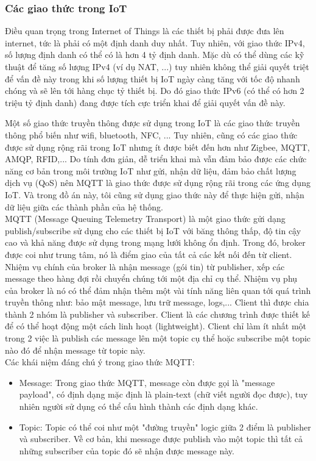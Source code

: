 \subsubsection{Các giao thức trong IoT}
Điều quan trọng trong Internet of Things là các thiết bị phải được đưa lên internet, tức là phải có một định danh duy nhất. Tuy nhiên, với giao thức IPv4, số lượng định danh có thể có là hơn 4 tỷ định danh. Mặc dù có thể dùng các kỹ thuật để tăng số lượng IPv4 (ví dụ NAT, ...) tuy nhiên không thể giải quyết triệt để vấn đề này trong khi số lượng thiết bị IoT ngày càng tăng với tốc độ nhanh chóng và sẽ lên tới hàng chục tỷ thiết bị. Do đó giao thức IPv6 (có thể có hơn 2 triệu tỷ định danh) đang được tích cực triển khai để giải quyết vấn đề này. 

Một số giao thức truyền thông được sử dụng trong IoT là các giao thức truyền thông phổ biến như wifi, bluetooth, NFC, ... Tuy nhiên, cũng có các giao thức được sử dụng rộng rãi trong IoT nhưng ít được biết đến hơn như Zigbee, MQTT, AMQP, RFID,... Do tính đơn giản, dễ triển khai mà vẫn đảm bảo được các chức năng cơ bản trong môi trường IoT như gửi, nhận dữ liệu, đảm bảo chất lượng dịch vụ (QoS) nên MQTT là giao thức được sử dụng rộng rãi trong các ứng dụng IoT. Và trong đồ án này, tôi cũng sử dụng giao thức này để thực hiện gửi, nhận dữ liệu giữa các thành phần của hệ thống.\\ 
MQTT (Message Queuing Telemetry Transport) là một giao thức gửi dạng publish/subscribe sử dụng cho các thiết bị IoT với băng thông thấp, độ tin cậy cao và khả năng được sử dụng trong mạng lưới không ổn định. Trong đó, broker được coi như trung tâm, nó là điểm giao của tất cả các kết nối đến từ client. Nhiệm vụ chính của broker là nhận message (gói tin) từ publisher, xếp các message theo hàng đợi rồi chuyển chúng tới một địa chỉ cụ thể. Nhiệm vụ phụ của broker là nó có thể đảm nhận thêm một vài tính năng liên quan tới quá trình truyền thông như: bảo mật message, lưu trữ message, logs,... Client thì được chia thành 2 nhóm là publisher và subscriber. Client là các chương trình được thiết kế để có thể hoạt động một cách linh hoạt (lightweight). Client chỉ làm ít nhất một trong 2 việc là publish các message lên một topic cụ thể hoặc subscribe một topic nào đó để nhận message từ topic này. \\
Các khái niệm đáng chú ý trong giao thức MQTT:
\begin{itemize}
	\item Message: Trong giao thức MQTT, message còn được gọi là "message payload", có định dạng mặc định là plain-text (chữ viết người đọc được), tuy nhiên người sử dụng có thể cấu hình thành các định dạng khác.
	\item Topic: Topic có thể coi như một "đường truyền" logic giữa 2 điểm là publisher và subscriber. Về cơ bản, khi message được publish vào một topic thì tất cả những subscriber của topic đó sẽ nhận được message này. 
\end{itemize}

